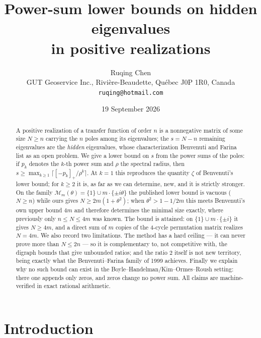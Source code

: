 \documentclass[11pt]{article}
\title{\bfseries Power-sum lower bounds on hidden eigenvalues\\ in positive realizations}
\author{Ruqing Chen\\[2pt]
\normalsize GUT Geoservice Inc., Rivi\`ere-Beaudette, Qu\'ebec J0P 1R0, Canada\\
\normalsize\texttt{ruqing@hotmail.com}}
\date{19 September 2026}
\theoremstyle{plain}
\theoremstyle{remark}
\newcommand{\M}{\mathcal{M}}
\begin{document}
\maketitle

\begin{abstract}
\noindent
A positive realization of a transfer function of order $n$ is a nonnegative matrix of some
size $N\ge n$ carrying the $n$ poles among its eigenvalues; the $s=N-n$ remaining
eigenvalues are the \emph{hidden} eigenvalues, whose characterization Benvenuti and Farina
list as an open problem. We give a lower bound on $s$ from the power sums of the poles: if
$p_k$ denotes the $k$-th power sum and $\rho$ the spectral radius, then
$s\ge\max_{k\ge1}\lceil[-p_k]_+/\rho^k\rceil$. At $k=1$ this reproduces the quantity
$\zeta$ of Benvenuti's lower bound; for $k\ge2$ it is, as far as we can determine, new, and
it is strictly stronger. On the family $\M_m(\theta)=\{1\}\cup m\cdot\{\pm i\theta\}$ the
published lower bound is vacuous ($N\ge n$) while ours gives $N\ge 2m(1+\theta^{2})$; when
$\theta^{2}>1-1/2m$ this meets Benvenuti's own upper bound $4m$ and therefore determines
the minimal size exactly, where previously only $n\le N\le 4m$ was known. The bound is
attained: on $\{1\}\cup m\cdot\{\pm i\}$ it gives $N\ge4m$, and a direct sum of $m$ copies
of the $4$-cycle permutation matrix realizes $N=4m$. We also record two limitations. The
method has a hard ceiling --- it can never prove more than $N\le2n$ --- so it is
complementary to, not competitive with, the digraph bounds that give unbounded ratios; and
the ratio $2$ itself is not new territory, being exactly what the Benvenuti--Farina family
of 1999 achieves. Finally we explain why no such bound can exist in the
Boyle--Handelman/Kim--Ormes--Roush setting: there one appends only zeros, and zeros change
no power sum. All claims are machine-verified in exact rational arithmetic.
\end{abstract}

\section{Introduction}\label{sec:intro}
\end{document}

